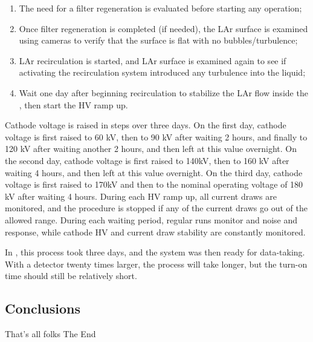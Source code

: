\begin{enumerate}

    \item The need for a filter regeneration is evaluated before starting any operation;

    \item Once filter regeneration is completed (if needed), the LAr surface is examined using cameras to verify that the surface is flat with no bubbles/turbulence;
    
    \item LAr recirculation is started, and LAr surface is examined again to see if activating the recirculation system introduced any turbulence into the liquid;
    
    \item Wait one day after beginning  recirculation to stabilize the LAr flow inside the , then start the HV ramp up.
    
\end{enumerate}

Cathode voltage is raised in steps over three days. 
On the first day, cathode voltage is first raised to 60 kV, then to 90 kV after waiting 2 hours, and finally to 120 kV after waiting another 2 hours, and then left at this value overnight.
On the second day, cathode voltage is first raised to 140kV, then to 160 kV after waiting 4 hours, and then left at this value overnight.
On the third day, cathode voltage is first raised to 170kV and then to the nominal operating voltage of 180 kV after waiting 4 hours.
During each HV ramp up, all  current draws are monitored, and the procedure is stopped if any of the current draws go out of the allowed range.
During each waiting period, regular  runs monitor  and  noise and response, while cathode HV and current draw stability are constantly monitored.

In  , this process took three days, and the system was then ready for data-taking. With a detector twenty times larger, the process will take longer, but the turn-on time should still be relatively short. 

\subsection{Conclusions}
\label{sec:fdsp-tc-inst-concl}

That's all folks
The End
